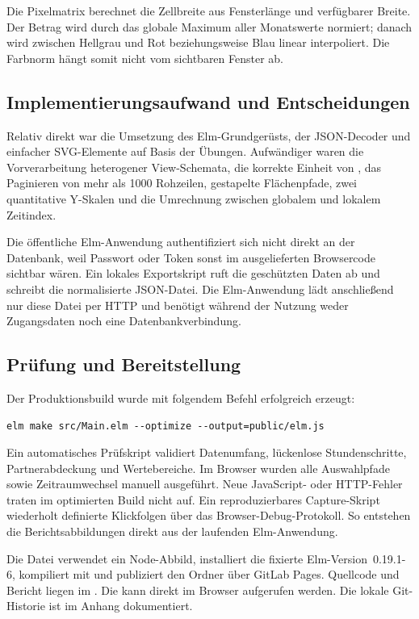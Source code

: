 Die Pixelmatrix berechnet die Zellbreite aus Fensterlänge und verfügbarer
Breite. Der Betrag wird durch das globale Maximum aller Monatswerte normiert;
danach wird zwischen Hellgrau und Rot beziehungsweise Blau linear interpoliert.
Die Farbnorm hängt somit nicht vom sichtbaren Fenster ab.

\subsection*{Implementierungsaufwand und Entscheidungen}

Relativ direkt war die Umsetzung des Elm-Grundgerüsts, der JSON-Decoder und
einfacher SVG-Elemente auf Basis der Übungen. Aufwändiger waren die
Vorverarbeitung heterogener View-Schemata, die korrekte Einheit von
, das Paginieren von mehr als 1000 Rohzeilen, gestapelte
Flächenpfade, zwei quantitative Y-Skalen und die Umrechnung zwischen globalem
und lokalem Zeitindex.

Die öffentliche Elm-Anwendung authentifiziert sich nicht direkt an der
Datenbank, weil Passwort oder Token sonst im ausgelieferten Browsercode sichtbar
wären. Ein lokales Exportskript ruft die geschützten Daten ab und schreibt die
normalisierte JSON-Datei. Die Elm-Anwendung lädt anschlie{\ss}end nur diese Datei
per HTTP und benötigt während der Nutzung weder Zugangsdaten noch eine
Datenbankverbindung.

\subsection*{Prüfung und Bereitstellung}

Der Produktionsbuild wurde mit folgendem Befehl erfolgreich erzeugt:

\begin{lstlisting}[language={}]
elm make src/Main.elm --optimize --output=public/elm.js
\end{lstlisting}

Ein automatisches Prüfskript validiert Datenumfang, lückenlose Stundenschritte,
Partnerabdeckung und Wertebereiche. Im Browser wurden alle Auswahlpfade sowie
Zeitraumwechsel manuell ausgeführt. Neue JavaScript- oder HTTP-Fehler traten im
optimierten Build nicht auf. Ein reproduzierbares Capture-Skript wiederholt
definierte Klickfolgen über das Browser-Debug-Protokoll. So entstehen die
Berichtsabbildungen direkt aus der laufenden Elm-Anwendung.

Die Datei  verwendet ein Node-Abbild, installiert die
fixierte Elm-Version~0.19.1-6, kompiliert mit  und publiziert
den Ordner  über GitLab Pages. Quellcode und Bericht liegen im
. Die
 kann direkt im Browser
aufgerufen werden. Die lokale Git-Historie ist im Anhang dokumentiert.

